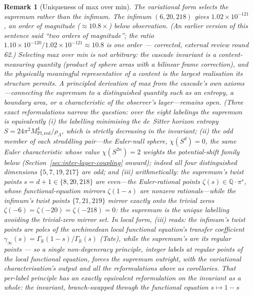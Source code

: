 \documentclass[11pt,a4paper]{article}
\newtheorem{remark}[theorem]{Remark}
\begin{document}
\begin{remark}[Uniqueness of max over min]
The variational form selects the supremum rather than the infimum.
The infimum $(6,20,218)$ gives $1.02\times 10^{-121}$, an order of
magnitude ($\approx 10.8\times$) below observation. (An earlier
version of this sentence said ``two orders of magnitude''; the ratio
$1.10\times 10^{-120}/1.02\times 10^{-121}\approx 10.8$ is one order
--- corrected, external review round 62.) Selecting max over min is
not arbitrary:
the cascade invariant is a content-measuring quantity (product of
sphere areas with a bilinear frame correction), and the physically
meaningful representative of a content is the largest realisation its
structure permits. A principled derivation of max from the cascade's
own axioms---connecting the supremum to a distinguished quantity such
as an entropy, a boundary area, or a characteristic of the observer's
layer---remains open. (Three exact reformulations narrow the question:
over the eight labelings the supremum is equivalently (i) the
labelling minimising the de~Sitter horizon entropy
$S = 24\pi^2 M^4_{\mathrm{Pl,red}}/\rho_\Lambda$, which is strictly
decreasing in the invariant; (ii) the \emph{odd} member of each
straddling pair---the Euler-null sphere, $\chi(S^d) = 0$, the same
Euler characteristic whose value $\chi(S^{2n}) = 2$ weights the
potential-shift family below (Section~\ref{sec:inter-layer-coupling}
onward); indeed all four distinguished
dimensions $\{5, 7, 19, 217\}$ are odd; and (iii) arithmetically: the
supremum's twist points $s = d+1 \in \{8, 20, 218\}$ are even---the
Euler-rational points $\zeta(s) \in \mathbb{Q}\cdot\pi^s$, whose
functional-equation mirrors $\zeta(1-s)$ are nonzero rationals---while
the infimum's twist points $\{7, 21, 219\}$ mirror exactly onto the
trivial zeros $\zeta(-6) = \zeta(-20) = \zeta(-218) = 0$: the supremum
is the unique labelling avoiding the trivial-zero mirror set. In
local form, (iii) reads: the infimum's twist points are poles of
the archimedean local functional equation's transfer coefficient
$\gamma_\infty(s) = \Gamma_{\mathbb{R}}(1-s)/\Gamma_{\mathbb{R}}(s)$
(Tate), while the supremum's are its regular points --- so a single
non-degeneracy principle, \emph{integer labels at regular points of
the local functional equation}, forces the supremum outright, with
the variational characterisation's output and all the reformulations
above as corollaries. That per-label principle has an exactly
equivalent reformulation on the invariant as a whole: the invariant,
branch-swapped through the functional equation $s \mapsto 1-s$

\end{remark}
\end{document}
